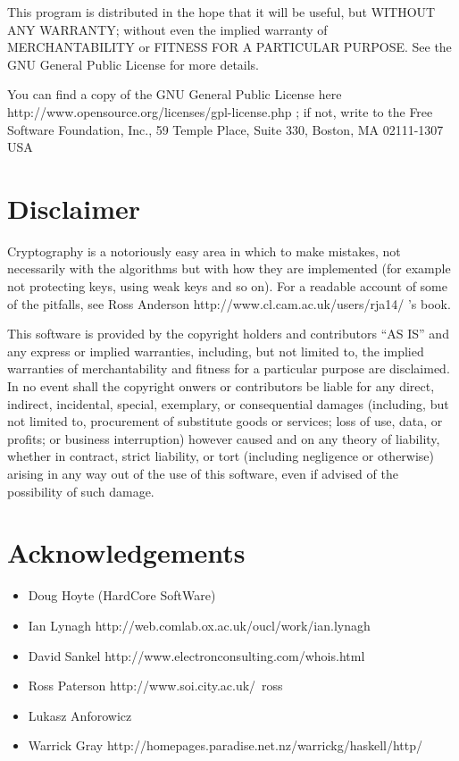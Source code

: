 \documentclass{article}
\begin{document}
This program is distributed in the hope that it will be useful, but WITHOUT ANY WARRANTY; without even the implied warranty of MERCHANTABILITY or FITNESS FOR A PARTICULAR PURPOSE. See the GNU General Public License for more details.

You can find a copy of
the GNU General Public License 
\htmladdnormallinkfoot
{here}
{http://www.opensource.org/licenses/gpl-license.php}
; 
if not, write to the Free Software Foundation, Inc., 59 Temple Place, 
Suite 330, Boston, MA 02111-1307 USA

\section{Disclaimer}
Cryptography is a notoriously easy area in which to make mistakes, 
not necessarily with the algorithms but with how they are implemented 
(for example not protecting keys, using weak keys and so on). 
For a readable account of some of the pitfalls, see 
\htmladdnormallinkfoot
{Ross Anderson}
{http://www.cl.cam.ac.uk/users/rja14/}
's book.

\begin{sc}
This software is provided by the copyright holders and contributors ``AS IS'' 
and any express or implied warranties, including, but not limited to, 
the implied warranties of merchantability and fitness for a particular 
purpose are disclaimed. In no event shall the copyright onwers or
contributors be liable for any direct, indirect, incidental, special,
exemplary, or consequential damages (including, but not limited to,
procurement of substitute goods or services; loss of use, data, or profits;
or business interruption) however caused and on any theory of liability,
whether in contract, strict liability, or tort (including negligence or
otherwise) arising in any way out of the use of this software,
even if advised of the possibility of such damage.
\end{sc}

\section{Acknowledgements}

\begin{itemize}
\item
Doug Hoyte (HardCore SoftWare)
\item
\htmladdnormallinkfoot
   {Ian Lynagh}
   {http://web.comlab.ox.ac.uk/oucl/work/ian.lynagh}
\item
\htmladdnormallinkfoot
   {David Sankel}
   {http://www.electronconsulting.com/whois.html}
\item
\htmladdnormallinkfoot 
{Ross Paterson}
{http://www.soi.city.ac.uk/~ross}
\item
Lukasz Anforowicz
\item
\htmladdnormallinkfoot 
{Warrick Gray}
{http://homepages.paradise.net.nz/warrickg/haskell/http/}
\end{itemize}
\end{document}

